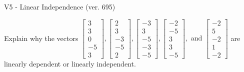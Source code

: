 \begin{exercise}
  \begin{exerciseTitle}V5 - Linear Independence (ver. 695)\end{exerciseTitle}
  \begin{exerciseStatement}
    Explain why the vectors \(\left[\begin{array}{r}
3 \\
3 \\
0 \\
-5 \\
3
\end{array}\right] , \left[\begin{array}{r}
2 \\
3 \\
-3 \\
-5 \\
2
\end{array}\right] , \left[\begin{array}{r}
-3 \\
3 \\
-5 \\
-3 \\
-5
\end{array}\right] , \left[\begin{array}{r}
-2 \\
-5 \\
3 \\
3 \\
-5
\end{array}\right] , \text{ and } \left[\begin{array}{r}
-2 \\
5 \\
-2 \\
1 \\
-2
\end{array}\right]\) are linearly dependent or linearly independent.	



\end{exerciseStatement}
\end{exercise}
